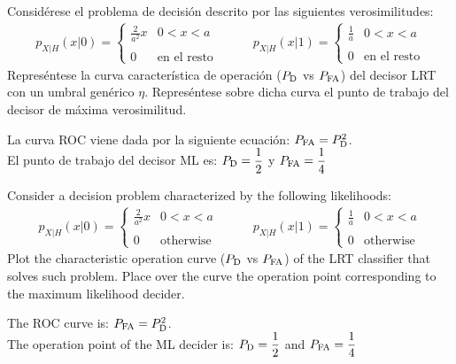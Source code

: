 \ifspanish

\question Considérese el problema de decisión descrito por las siguientes verosimilitudes:
 $$ \begin{array}{ll} 
 p_{X|H}(x|0) = \left\lbrace  \begin{array}{ll} \displaystyle \frac{2}{a^2} x & 0<x<a \\ \\
 0 & \mbox{en el resto}    \end{array}      \right. & \quad \quad
 p_{X|H}(x|1) = \left\lbrace  \begin{array}{ll} \displaystyle  \frac{1}{a} & 0<x<a \\ \\
 0 & \mbox{en el resto}    \end{array}      \right. 
 \end{array}$$	 
Represéntese la curva característica de operación ($P_{\rm D}$ vs $P_{\rm FA}$) del decisor LRT con un umbral genérico $\eta$. Represéntese sobre dicha curva el punto de trabajo del decisor de máxima verosimilitud.
\begin{solution}
La curva ROC viene dada por la siguiente ecuación: $P_{\rm FA}=P_{\rm D}^2$. \\
El punto de trabajo del decisor ML es: $P_{\rm D}=\displaystyle \frac{1}{2}$ y  $P_{\rm FA}=\displaystyle \frac{1}{4}$
\end{solution}

\else

\question Consider a decision problem characterized by the following likelihoods:
 $$ \begin{array}{ll} 
 p_{X|H}(x|0) = \left\lbrace  \begin{array}{ll} \displaystyle \frac{2}{a^2} x & 0<x<a \\ \\
 0 & \mbox{otherwise}    \end{array}      \right. & \quad \quad
 p_{X|H}(x|1) = \left\lbrace  \begin{array}{ll} \displaystyle  \frac{1}{a} & 0<x<a \\ \\
 0 & \mbox{otherwise}    \end{array}      \right. 
 \end{array}$$	 
Plot the characteristic operation curve ($P_{\rm D}$ vs $P_{\rm FA}$) of the LRT classifier that solves such problem. Place over the curve the operation point corresponding to the maximum likelihood decider.

\begin{solution}
The ROC curve is: $P_{\rm FA}=P_{\rm D}^2$. \\
The operation point of the ML decider is: $P_{\rm D}=\displaystyle \frac{1}{2}$ and  $P_{\rm FA}=\displaystyle \frac{1}{4}$
\end{solution}

\fi